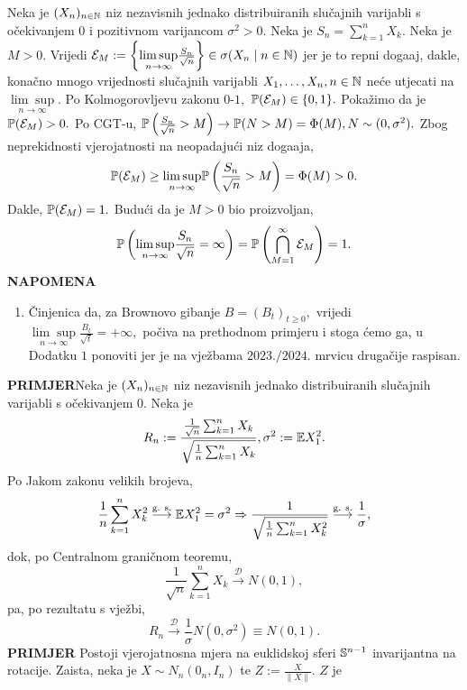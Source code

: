 \documentclass{article}
\begin{document}
Neka je \((X_n)_{n\in\Bbb N}\) niz nezavisnih jednako distribuiranih slučajnih varijabli s očekivanjem \(0\) i pozitivnom varijancom \(\sigma^2>0.\) Neka je \(S_n=\sum_{k=1}^nX_k.\) Neka je \(M>0.\) Vrijedi \(\mathcal E_M:=\left\{\underset{n\to\infty}{\lim\sup}\frac{S_n}{\sqrt n}\right\}\in\sigma(X_n\mid n\in\Bbb N)\) jer je to repni doga\dj{}aj, dakle, konačno mnogo vrijednosti slučajnih varijabli \(X_1,\ldots, X_n,n\in\Bbb N\) neće utjecati na \(\underset{n\to\infty}{\lim\sup}.\) Po Kolmogorovljevu zakonu \(0\)-\(1,\) \(\Bbb P(\mathcal E_M)\in\{0,1\}.\) Pokažimo da je \(\Bbb P(\mathcal E_M)>0.\) Po CGT-u, \(\Bbb P\left(\frac{S_n}{\sqrt n}>M\right)\to\Bbb P(N>M)=\Phi(M),N\sim(0,\sigma^2).\) Zbog neprekidnosti vjerojatnosti na neopadajući niz doga\dj{}aja, \[\Bbb P(\mathcal E_M)\ge\underset{n\to\infty}{\lim\sup}\Bbb P\left(\frac{S_n}{\sqrt n}>M\right)=\Phi(M)>0.\] Dakle, \(\Bbb P(\mathcal E_M)=1.\) Budući da je \(M>0\) bio proizvoljan,  \[\Bbb P\left(\underset{n\to\infty}{\lim\sup}\frac{S_n}{\sqrt n}=\infty\right)=\Bbb P\left(\bigcap_{M=1}^\infty\mathcal E_M\right)=1.\] 
\textbf{NAPOMENA}
\begin{enumerate}
    \item[\ding{228}] Činjenica da, za Brownovo gibanje \(B=(B_t)_{t\ge0},\) vrijedi \(\underset{n\to\infty}{\lim\sup}\frac{B_t}{\sqrt t}=+\infty,\) počiva na prethodnom primjeru i stoga ćemo ga, u \textsection Dodatku \(1\) ponoviti jer je na vježbama \(2023./2024.\) mrvicu drugačije raspisan.  
\end{enumerate}
\textbf{PRIMJER}\newline Neka je \((X_n)_{n\in\Bbb N}\) niz nezavisnih jednako distribuiranih slučajnih varijabli s očekivanjem \(0.\) Neka je \[R_n:=\frac{\frac1{\sqrt n}\sum_{k=1}^nX_k}{\sqrt{\frac1n\sum_{k=1}^nX_k}},\sigma^2:=\Bbb EX_1^2.\] Po Jakom zakonu velikih brojeva, \[\frac1n\sum_{k=1}^nX_k^2\overset{\text{g. s.}}{\longrightarrow}\Bbb EX_1^2=\sigma^2\Rightarrow\frac1{\sqrt{\frac1n\sum_{k=1}^nX_k^2}}\overset{\text{g. s.}}{\longrightarrow}\frac1\sigma,\] dok, po Centralnom graničnom teoremu, \[\frac1{\sqrt n}\sum_{k=1}^nX_k\overset{\mathcal D}{\longrightarrow} N(0,1),\] pa, po rezultatu s vježbi, \[R_n\overset{\mathcal D}{\longrightarrow}\frac1\sigma N(0,\sigma^2)\equiv N(0,1).\]  
\textbf{PRIMJER}\newline
Postoji vjerojatnosna mjera na euklidskoj sferi \(\Bbb S^{n-1}\) invarijantna na rotacije. Zaista, neka je \(X\sim N_n(0_n,I_n)\) te \(Z:=\frac{X}{\|X\|}.\) \(Z\) je 
\end{document}
